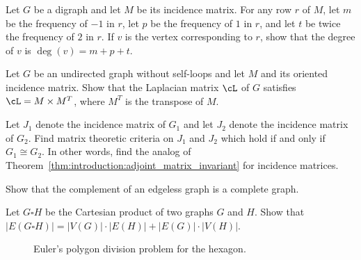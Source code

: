 \begin{problem}
\item Let $G$ be a digraph and let $M$ be its incidence matrix. For
  any row $r$ of $M$, let $m$ be the frequency of $-1$ in $r$, let
  $p$ be the frequency of $1$ in $r$, and let $t$ be twice the
  frequency of $2$ in $r$. If $v$ is the vertex corresponding to
  $r$, show that the degree of $v$ is $\deg(v) = m + p + t$.

\item Let $G$ be an undirected graph without self-loops and let $M$
  and its oriented incidence matrix. Show that the Laplacian matrix
  $\cL$ of $G$ satisfies $\cL = M \times M^T$, where
  $M^T$ is the transpose of $M$.

\item Let $J_1$ denote the incidence matrix of $G_1$ and let $J_2$
  denote the incidence matrix of $G_2$. Find matrix theoretic criteria
  on $J_1$ and $J_2$ which hold if and only if $G_1 \cong G_2$. In
  other words, find the analog of
  Theorem~\ref{thm:introduction:adjoint_matrix_invariant} for
  incidence matrices.

\item Show that the complement of an edgeless graph is a complete
  graph.

\item Let $G \square H$ be the Cartesian product of two graphs $G$ and
  $H$. Show that
  $|E(G \square H)| = |V(G)| \cdot |E(H)| + |E(G)| \cdot |V(H)|$.

\begin{figure}[!htbp]
\centering
{}

\caption{Euler's polygon division problem for the hexagon.}
\label{fig:introduction:Euler_polygon_division_hexagon}
\end{figure}


\end{problem}
